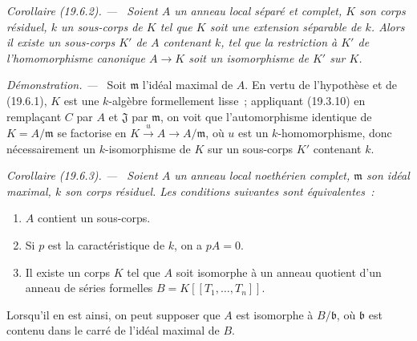 \documentclass[10pt,oneside]{book}
\makeatletter
\newcommand{\setmanualcurrentlabel}[1]{\def\@currentlabel{#1}}
\newenvironment{corollary}[1][]{%
  \setmanualcurrentlabel{#1}\par\medskip\noindent\itshape Corollaire (#1). ---\ }{\par}
\newenvironment{proof}{%
  \par\medskip\noindent\textit{Démonstration. ---\ }}{\par}
\makeatother
\begin{document}
\begin{corollary}[19.6.2]
\label{0.19.6.2-fr}
Soient $A$ un anneau local séparé et complet, $K$ son corps résiduel, $k$ un
sous-corps de $K$ tel que $K$ soit une extension séparable de $k$. Alors il
existe un sous-corps $K'$ de $A$ contenant $k$, tel que la restriction à $K'$
de l'homomorphisme canonique $A\to K$ soit un isomorphisme de $K'$ sur $K$.
\end{corollary}

\begin{proof}
Soit $\mathfrak m$ l'idéal maximal de $A$. En vertu de l'hypothèse et de
(19.6.1), $K$ est une $k$-algèbre formellement lisse~; appliquant (19.3.10) en
remplaçant $C$ par $A$ et $\mathfrak J$ par $\mathfrak m$, on voit que
l'automorphisme identique de $K=A/\mathfrak m$ se factorise en
$K\xrightarrow{u}A\to A/\mathfrak m$, où $u$ est un $k$-homomorphisme, donc
nécessairement un $k$-isomorphisme de $K$ sur un sous-corps $K'$ contenant
$k$.
\end{proof}

\begin{corollary}[19.6.3]
\label{0.19.6.3-fr}
Soient $A$ un anneau local noethérien complet, $\mathfrak m$ son idéal maximal,
$k$ son corps résiduel. Les conditions suivantes sont équivalentes~:
\begin{enumerate}
  \item[a)] $A$ contient un sous-corps.
  \item[b)] Si $p$ est la caractéristique de $k$, on a $pA=0$.
  \item[c)] Il existe un corps $K$ tel que $A$ soit isomorphe à un anneau
  quotient d'un anneau de séries formelles $B=K[[T_1,\ldots,T_n]]$.
\end{enumerate}
Lorsqu'il en est ainsi, on peut supposer que $A$ est isomorphe à $B/\mathfrak b$,
où $\mathfrak b$ est contenu dans le carré de l'idéal maximal de $B$.
\end{corollary}
\end{document}
